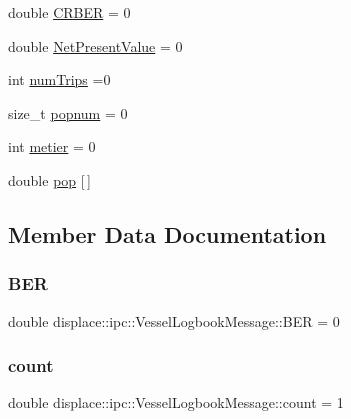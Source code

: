 \begin{DoxyCompactItemize}
\item 
double \mbox{\hyperlink{structdisplace_1_1ipc_1_1_vessel_logbook_message_a285ae2cad4424b362320f5d2722efe03}{C\+R\+B\+ER}} = 0
\item 
double \mbox{\hyperlink{structdisplace_1_1ipc_1_1_vessel_logbook_message_a56af094b53eb3c52797e3c9b5f289b18}{Net\+Present\+Value}} = 0
\item 
int \mbox{\hyperlink{structdisplace_1_1ipc_1_1_vessel_logbook_message_a9b0f355e1a2759b65861e8096bb68922}{num\+Trips}} =0
\item 
size\+\_\+t \mbox{\hyperlink{structdisplace_1_1ipc_1_1_vessel_logbook_message_a26616f597116e1b3774cdf67f95801ad}{popnum}} = 0
\item 
int \mbox{\hyperlink{structdisplace_1_1ipc_1_1_vessel_logbook_message_a95913d042bdb93a9174741d4d9f314a5}{metier}} = 0
\item 
double \mbox{\hyperlink{structdisplace_1_1ipc_1_1_vessel_logbook_message_a90915fa3c7dd5e9e404296dbdf7821ad}{pop}} \mbox{[}$\,$\mbox{]}
\end{DoxyCompactItemize}


\subsection{Member Data Documentation}
\mbox{\label{structdisplace_1_1ipc_1_1_vessel_logbook_message_af29a39e7728639252263e5fb14e3a406}} 
\subsubsection{\texorpdfstring{BER}{BER}}
{\footnotesize\ttfamily double displace\+::ipc\+::\+Vessel\+Logbook\+Message\+::\+B\+ER = 0}

\mbox{\label{structdisplace_1_1ipc_1_1_vessel_logbook_message_a32eb853ab129ba1fdc7244348b3f68a3}} 
\subsubsection{\texorpdfstring{count}{count}}
{\footnotesize\ttfamily double displace\+::ipc\+::\+Vessel\+Logbook\+Message\+::count = 1}

